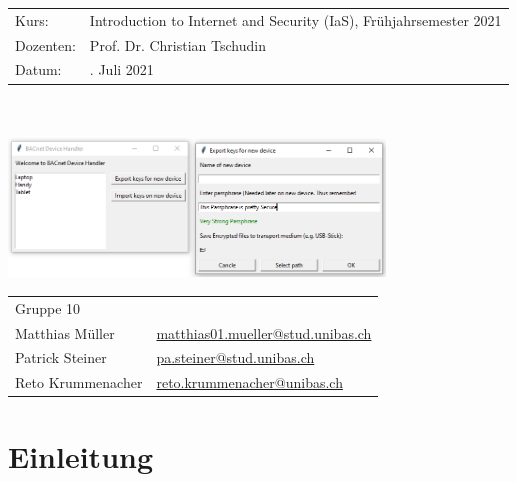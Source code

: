 \documentclass[a4paper,titlepage]{article}
\newcommand{\titleName}{Multi Device Feed}
\begin{document}

\begin{titlepage}
	\begin{tabular}{@{}ll}
		Kurs: &\indent Introduction to Internet and Security (IaS), Frühjahrsemester 2021  \\
		Dozenten: &\indent Prof. Dr. Christian Tschudin  \\
		Datum: &\indent 18. Juli 2021
	\end{tabular}
	\vspace*{1cm}   
	\begin{center}
		\large
		{\color{NavyBlue}{Projekt Report}} \\	
		\vspace*{1cm}   
	        \Huge
	        {\color{NavyBlue}{BACnet: \\ \titleName}}\\
	        \Large
        	\vspace*{1cm}   
	        \includegraphics[width=0.75\textwidth]{figures/UI}  
		\vfill
	        \normalsize
		\begin{tabular}{@{}ll}
			Gruppe 10 \\
			Matthias Müller &\indent \href{mailto:matthias01.mueller@stud.unibas.ch}{matthias01.mueller@stud.unibas.ch}  \\
			Patrick Steiner &\indent \href{mailto:pa.steiner@stud.unibas.ch}{pa.steiner@stud.unibas.ch}  \\
			Reto Krummenacher &\indent \href{mailto:reto.krummenacher@unibas.ch}{reto.krummenacher@unibas.ch}
		\end{tabular}
	\end{center}  
\end{titlepage}

\clearpage
\setcounter{page}{1}


\section{Einleitung}
\end{document}
